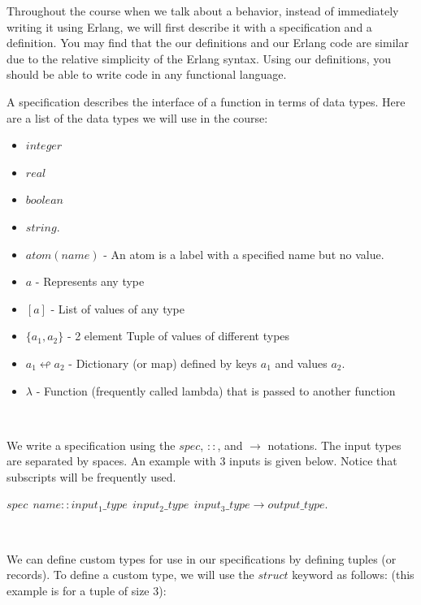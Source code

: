 \documentclass[
]{book}
\providecommand{\tightlist}{%
  \setlength{\itemsep}{0pt}\setlength{\parskip}{0pt}}
\begin{document}
Throughout the course when we talk about a behavior, instead of immediately writing it using Erlang, we will first describe it with a specification and a definition. You may find that the our definitions and our Erlang code are similar due to the relative simplicity of the Erlang syntax. Using our definitions, you should be able to write code in any functional language.

A specification describes the interface of a function in terms of data types. Here are a list of the data types we will use in the course:

\begin{formulabox}

\begin{itemize}
\tightlist
\item
  \(integer\)
\item
  \(real\)
\item
  \(boolean\)
\item
  \(string\).
\item
  \(atom(name)\) - An atom is a label with a specified name but no value.\\
\item
  \(a\) - Represents any type
\item
  \([a]\) - List of values of any type
\item
  \(\lbrace a_1,a_2 \rbrace\) - 2 element Tuple of values of different types
\item
  \(a_1 \looparrowleft a_2\) - Dictionary (or map) defined by keys \(a_1\) and values \(a_2\).
\item
  \(\lambda\) - Function (frequently called lambda) that is passed to another function
\end{itemize}

\end{formulabox}

\(\nonumber\)

We write a specification using the \(spec\), \(::\), and \(\rightarrow\) notations. The input types are separated by spaces. An example with 3 inputs is given below. Notice that subscripts will be frequently used.

\begin{formulabox}
\(spec ~ ~ name :: input_1\_type ~ ~ input_2\_type ~ ~ input_3\_type \rightarrow output\_type.\)

\end{formulabox}

\(\nonumber\)

We can define custom types for use in our specifications by defining tuples (or records). To define a custom type, we will use the \(struct\) keyword as follows: (this example is for a tuple of size 3):
\end{document}
